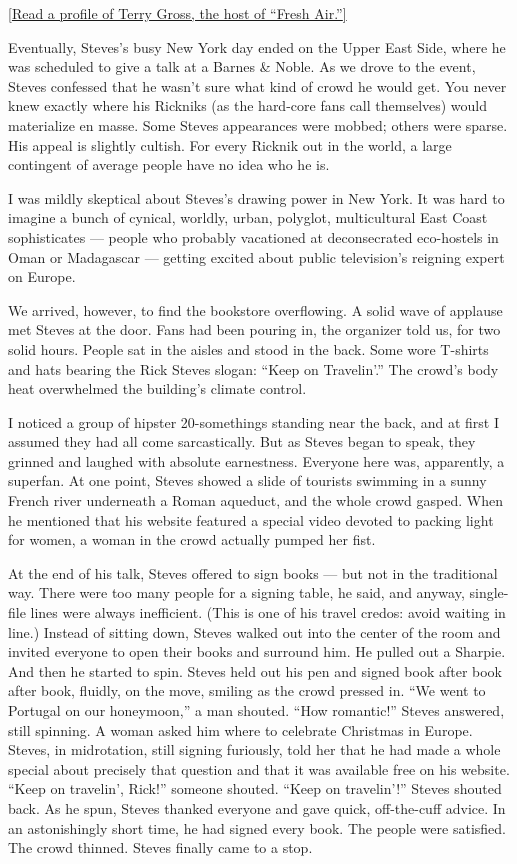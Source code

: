 \href{https://www.nytimes3xbfgragh.onion/2015/10/25/magazine/terry-gross-and-the-art-of-opening-up.html}{{[}Read
a profile of Terry Gross, the host of ``Fresh Air.''{]}}

Eventually, Steves's busy New York day ended on the Upper East Side,
where he was scheduled to give a talk at a Barnes \& Noble. As we drove
to the event, Steves confessed that he wasn't sure what kind of crowd he
would get. You never knew exactly where his Rickniks (as the hard-core
fans call themselves) would materialize en masse. Some Steves
appearances were mobbed; others were sparse. His appeal is slightly
cultish. For every Ricknik out in the world, a large contingent of
average people have no idea who he is.

I was mildly skeptical about Steves's drawing power in New York. It was
hard to imagine a bunch of cynical, worldly, urban, polyglot,
multicultural East Coast sophisticates --- people who probably
vacationed at deconsecrated eco-hostels in Oman or Madagascar ---
getting excited about public television's reigning expert on Europe.

We arrived, however, to find the bookstore overflowing. A solid wave of
applause met Steves at the door. Fans had been pouring in, the organizer
told us, for two solid hours. People sat in the aisles and stood in the
back. Some wore T-shirts and hats bearing the Rick Steves slogan: ``Keep
on Travelin'.'' The crowd's body heat overwhelmed the building's climate
control.

I noticed a group of hipster 20-somethings standing near the back, and
at first I assumed they had all come sarcastically. But as Steves began
to speak, they grinned and laughed with absolute earnestness. Everyone
here was, apparently, a superfan. At one point, Steves showed a slide of
tourists swimming in a sunny French river underneath a Roman aqueduct,
and the whole crowd gasped. When he mentioned that his website featured
a special video devoted to packing light for women, a woman in the crowd
actually pumped her fist.

At the end of his talk, Steves offered to sign books --- but not in the
traditional way. There were too many people for a signing table, he
said, and anyway, single-file lines were always inefficient. (This is
one of his travel credos: avoid waiting in line.) Instead of sitting
down, Steves walked out into the center of the room and invited everyone
to open their books and surround him. He pulled out a Sharpie. And then
he started to spin. Steves held out his pen and signed book after book
after book, fluidly, on the move, smiling as the crowd pressed in. ``We
went to Portugal on our honeymoon,'' a man shouted. ``How romantic!''
Steves answered, still spinning. A woman asked him where to celebrate
Christmas in Europe. Steves, in midrotation, still signing furiously,
told her that he had made a whole special about precisely that question
and that it was available free on his website. ``Keep on travelin',
Rick!'' someone shouted. ``Keep on travelin'!'' Steves shouted back. As
he spun, Steves thanked everyone and gave quick, off-the-cuff advice. In
an astonishingly short time, he had signed every book. The people were
satisfied. The crowd thinned. Steves finally came to a stop.

